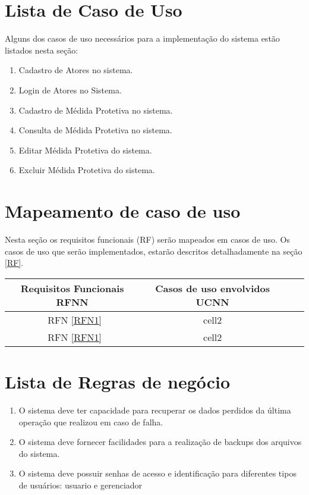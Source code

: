 \documentclass[
	12pt,				%
    oneside,			%
	a4paper,			%
	chapter=TITLE,		%
	english,			%
	french,				%
	spanish,			%
	brazil,				%
	]{abntex2}
\begin{document}
	\section{Lista de Caso de Uso}
		Alguns dos casos de uso necessários para a implementação do sistema estão listados nesta seção:
		\begin{enumerate}
			\item Cadastro de Atores no sistema.
			\item Login de Atores no Sistema.
			\item Cadastro de Médida Protetiva no sistema.
			\item Consulta de Médida Protetiva no sistema.
			\item Editar Médida Protetiva do sistema.
			\item Excluir Médida Protetiva do sistema.
		\end{enumerate}
	\section{Mapeamento de caso de uso}
		 Nesta seção os requisitos funcionais (RF) serão mapeados em casos de uso. Os casos de uso que serão implementados, estarão descritos detalhadamente na seção \ref{RF}.

		\begin{center}
			\begin{tabular}{ |c|c|c|c| } 
				\hline
				Requisitos Funcionais
				RFNN  & Casos de uso envolvidos
				UCNN \\
				\hline
				~RFN \ref{RFN1} & cell2 \\ 
				\hline
				~RFN \ref{RFN1} & cell2 \\ 
				\hline
			
			\end{tabular}
		\end{center}
	

		
	\section{Lista de Regras de negócio}
		\begin{enumerate}
			\item O sistema deve ter capacidade para recuperar os dados perdidos da última operação que realizou em caso de falha.
			\item O sistema deve fornecer facilidades para a realização de backups dos arquivos do sistema.
			\item O sistema deve possuir senhas de acesso e identificação para diferentes tipos de usuários: usuario e gerenciador
		\end{enumerate}
	
\end{document}
